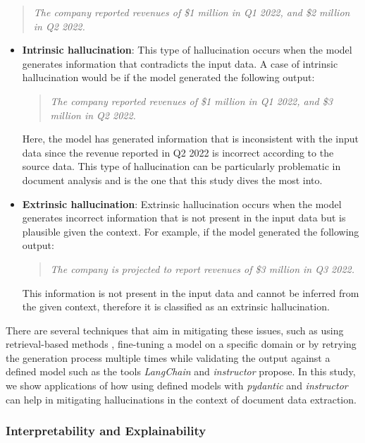 \documentclass[english, 12pt, a4paper, elec, utf8, a-2b, online]{aaltothesis}
\begin{document}
\begin{quote}
    \textit{The company reported revenues of \$1 million in Q1 2022, and \$2 million in Q2 2022.}
\end{quote}

\begin{itemize}
    \item \textbf{Intrinsic hallucination}: This type of hallucination occurs when the model generates information that contradicts the input data.
    A case of intrinsic hallucination would be if the model generated the following output:
    \begin{quote}
        \textit{The company reported revenues of \$1 million in Q1 2022, and \$3 million in Q2 2022.}
    \end{quote}
    Here, the model has generated information that is inconsistent with the input data since the revenue reported in Q2 2022 is incorrect according to the source data.
    This type of hallucination can be particularly problematic in document analysis and is the one that this study dives the most into.
    \item \textbf{Extrinsic hallucination}: Extrinsic hallucination occurs when the model generates incorrect information that is not present in the input data but is plausible given the context.
    For example, if the model generated the following output:
    \begin{quote}
        \textit{The company is projected to report revenues of \$3 million in Q3 2022.}
    \end{quote}
    This information is not present in the input data and cannot be inferred from the given context, therefore it is classified as an extrinsic hallucination.
\end{itemize}

There are several techniques that aim in mitigating these issues, such as using retrieval-based methods \cite{lewis2020retrievalaugmented}, fine-tuning a model on a specific domain \cite{brown2020language} or by retrying the generation process multiple times while validating the output against a defined model such as the tools \textit{LangChain} \cite{Chase_LangChain_2022} and \textit{instructor} \cite{Instructor2023} propose.
In this study, we show applications of how using defined models with \textit{pydantic} \cite{pydantic} and \textit{instructor} can help in mitigating hallucinations in the context of document data extraction.

\subsubsection{Interpretability and Explainability}
\end{document}
